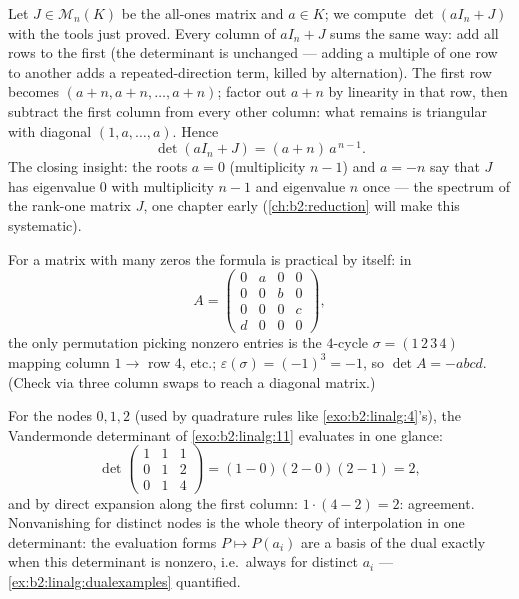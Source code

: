 \begin{example}\label{ex:b2:linalg:onesmatrix}
Let $J \in \mathcal{M}_n(K)$ be the all-ones matrix and $a \in K$;
we compute $\det(aI_n + J)$ with the tools just proved. Every
column of $aI_n + J$ sums the same way: add all rows to the first
(the determinant is unchanged --- adding a multiple of one row to
another adds a repeated-direction term, killed by alternation).
The first row becomes $(a + n, a + n, \dots, a + n)$; factor out
$a + n$ by linearity in that row, then subtract the first column
from every other column: what remains is triangular with diagonal
$(1, a, \dots, a)$. Hence
\[
\det(aI_n + J) = (a + n)\,a^{\,n-1}.
\]
The closing insight: the roots $a = 0$ (multiplicity $n - 1$) and
$a = -n$ say that $J$ has eigenvalue $0$ with multiplicity $n - 1$
and eigenvalue $n$ once --- the spectrum of the rank-one matrix
$J$, one chapter early (\cref{ch:b2:reduction} will make this
systematic).
\end{example}

\begin{example}\label{ex:b2:linalg:permexample}
For a matrix with many zeros the formula is practical by itself:
in
\[
A = \begin{pmatrix}
0 & a & 0 & 0\\
0 & 0 & b & 0\\
0 & 0 & 0 & c\\
d & 0 & 0 & 0
\end{pmatrix},
\]
the only permutation picking nonzero entries is the $4$-cycle
$\sigma = (1\,2\,3\,4)$ mapping column $1 \to$ row $4$, etc.;
$\varepsilon(\sigma) = (-1)^3 = -1$, so $\det A = -abcd$. (Check
via three column swaps to reach a diagonal matrix.)
\end{example}

\begin{example}\label{ex:b2:linalg:vandermondework}
For the nodes $0, 1, 2$ (used by quadrature rules like
\cref{exo:b2:linalg:4}'s), the Vandermonde determinant of
\cref{exo:b2:linalg:11} evaluates in one glance:
\[
\det\begin{pmatrix}
1 & 1 & 1\\
0 & 1 & 2\\
0 & 1 & 4
\end{pmatrix}
= (1 - 0)(2 - 0)(2 - 1) = 2 ,
\]
and by direct expansion along the first column: $1\cdot(4 - 2)
= 2$: agreement. Nonvanishing for distinct nodes is the whole
theory of interpolation in one determinant: the evaluation
forms $P \mapsto P(a_i)$ are a basis of the dual exactly when
this determinant is nonzero, i.e.\ always for distinct $a_i$
--- \cref{ex:b2:linalg:dualexamples} quantified.
\end{example}

